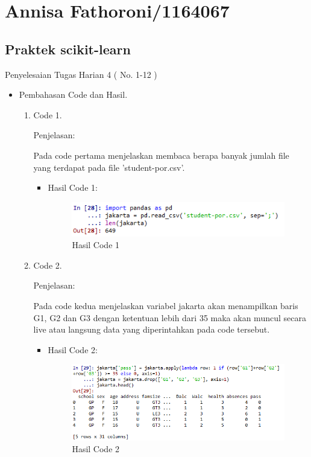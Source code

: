 \section{Annisa Fathoroni/1164067}
\subsection{Praktek scikit-learn}
Penyelesaian Tugas Harian 4 ( No. 1-12 )
\begin{itemize}
\item Pembahasan Code dan Hasil.
\begin{enumerate}
\item Code 1.

Penjelasan: 

Pada code pertama menjelaskan membaca berapa banyak jumlah file yang terdapat pada file 'student-por.csv'.

\begin{itemize}

\item Hasil Code 1:
\begin{figure}[ht]
\centering
\includegraphics[scale=0.4]{figures/AnnisaFathoroni-1.png}
\caption{Hasil Code 1}
\label{contoh}
\end{figure}

\end{itemize}

\item Code 2.

Penjelasan:

Pada code kedua menjelaskan variabel jakarta akan menampilkan baris G1, G2 dan G3 dengan ketentuan lebih dari 35 maka akan muncul secara live atau langsung data yang diperintahkan pada code tersebut.

\begin{itemize}


\item Hasil Code 2:

\begin{figure}[ht]
\centering
\includegraphics[scale=0.4]{figures/AnnisaFathoroni-2.png}
\caption{Hasil Code 2}
\label{contoh}
\end{figure}


\end{itemize}
\end{enumerate}
\end{itemize}
